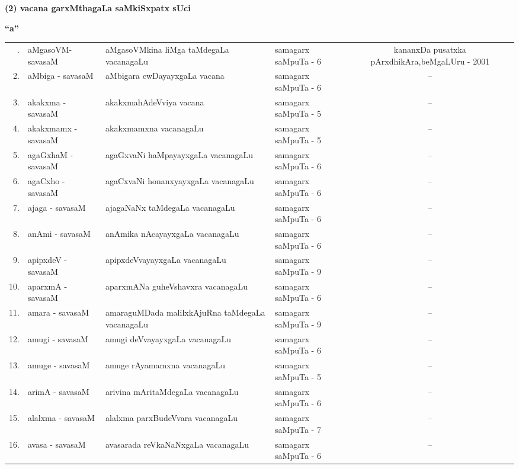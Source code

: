 \vskip 1cm

\begin{center}
{\large\bf (2) vacana garxMthagaLa saMkiSxpatx sUci}
\end{center}


\centerline{\bf ``a''}

{\renewcommand{\arraystretch}{1.3}
\begin{longtable}{rl>{\raggedright}p{5.5cm}lc}
\hline
\endfirsthead
\hline
\endhead
\hline
\endfoot
\endlastfoot
1. & aMgasoVM-savasaM & aMgasoVMkina liMga taMdegaLa vacanagaLu & samagarx saMpuTa - 6 & \multicolumn{1}{p{3.5cm}}{kananxDa pusatxka pArxdhikAra,\newline beMgaLUru - 2001}\\
2. & aMbiga - savasaM & aMbigara cwDayayxgaLa vacana & samagarx saMpuTa - 6 & --\\
3. & akakxma - savasaM & akakxmahAdeVviya vacana & samagarx saMpuTa - 5 & --\\
4. & akakxmamx - savasaM & akakxmamxna vacanagaLu & samagarx saMpuTa - 5 & --\\
5. & agaGxhaM - savasaM & agaGxvaNi haMpayayxgaLa vacanagaLu & samagarx saMpuTa - 6 & --\\
6. & agaCxho - savasaM & agaCxvaNi honanxyayxgaLa vacanagaLu & samagarx saMpuTa - 6 & --\\
7. & ajaga - savasaM & ajagaNaNx taMdegaLa vacanagaLu & samagarx saMpuTa - 6 & --\\
8. & anAmi - savasaM & anAmika nAcayayxgaLa vacanagaLu & samagarx saMpuTa - 6 & --\\
9. & apipxdeV - savasaM & apipxdeVvayayxgaLa vacanagaLu & samagarx saMpuTa - 9 & --\\
10. & aparxmA - savasaM & aparxmANa guheVshavxra vacanagaLu & samagarx saMpuTa - 6 & --\\
11. & amara - savasaM & amaraguMDada malilxkAjuRna taMdegaLa vacanagaLu & samagarx saMpuTa - 9 & --\\
12. & amugi - savasaM & amugi deVvayayxgaLa vacanagaLu & samagarx saMpuTa - 6 & --\\
13. & amuge - savasaM & amuge rAyamamxna vacanagaLu & samagarx saMpuTa - 5 & --\\
14. & arimA - savasaM & arivina mAritaMdegaLa vacanagaLu & samagarx saMpuTa - 6 & --\\
15. & alalxma - savasaM & alalxma parxBudeVvara vacanagaLu & samagarx saMpuTa - 7 & --\\
16. & avasa - savasaM &  avasarada reVkaNaNxgaLa vacanagaLu & samagarx saMpuTa - 6 & --\\
\hline
\end{longtable}}


